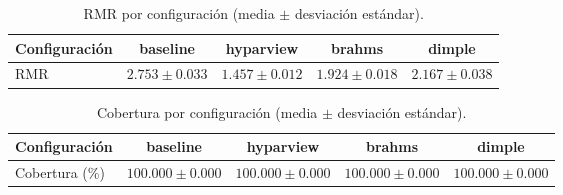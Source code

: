 \begin{table}[h]
\centering
\caption{RMR por configuración (media $\pm$ desviación estándar).}
\begin{tabular}{lcccc}
\hline
Configuración & baseline & hyparview & brahms & dimple \\
\hline
RMR & $2.753 \pm 0.033$ & $1.457 \pm 0.012$ & $1.924 \pm 0.018$ & $2.167 \pm 0.038$ & \\
\hline
\end{tabular}
\end{table}

\begin{table}[h]
\centering
\caption{Cobertura por configuración (media $\pm$ desviación estándar).}
\begin{tabular}{lcccc}
\hline
Configuración & baseline & hyparview & brahms & dimple \\
\hline
Cobertura (\%) & $100.000 \pm 0.000$ & $100.000 \pm 0.000$ & $100.000 \pm 0.000$ & $100.000 \pm 0.000$ & \\
\hline
\end{tabular}
\end{table}
